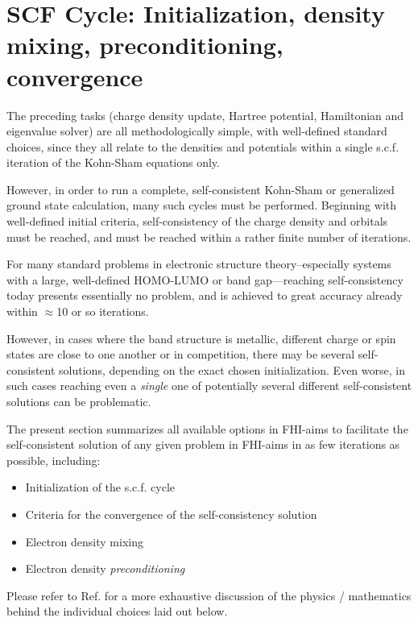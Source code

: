 \section{SCF Cycle: Initialization, density mixing, preconditioning, convergence} 
\label{Sec:scf}

The preceding tasks (charge density update, Hartree potential,
Hamiltonian and eigenvalue solver) are all methodologically simple,
with well-defined standard choices, since they all relate to the
densities and potentials within a single s.c.f. iteration of the
Kohn-Sham equations only.

However, in order to run a complete, self-consistent Kohn-Sham or
generalized ground state calculation, many such cycles must be
performed. Beginning with well-defined initial criteria,
self-consistency of the charge density and orbitals must be reached,
and must be reached within a rather finite number of iterations.

For many standard problems in electronic structure theory--especially
systems with a large, well-defined HOMO-LUMO or band gap---reaching
self-consistency today presents essentially no problem, and is
achieved to great accuracy already within $\approx$10 or so
iterations.

However, in cases where the band structure is metallic, different
charge or spin states are close to one another or in competition,
there may be several self-consistent solutions, depending on the
exact chosen initialization. Even worse, in such cases reaching even a
\emph{single} one of potentially several different self-consistent
solutions can be problematic.

The present section summarizes all available options in FHI-aims to
facilitate the self-consistent solution of any given problem in
FHI-aims in as few iterations as possible, including:
\begin{itemize}
 \item Initialization of the s.c.f. cycle
 \item Criteria for the convergence of the self-consistency solution
 \item Electron density mixing
 \item Electron density \emph{preconditioning}
\end{itemize}
Please refer to Ref. \cite{Blum08} for a more exhaustive discussion of
the physics / mathematics behind the individual choices laid out
below.

